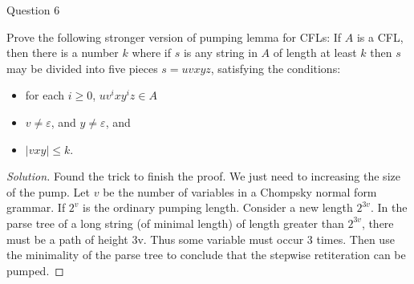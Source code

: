\begin{solution}{Question 6}\label{ques:6}
    \begin{question}
    Prove the following stronger version of pumping lemma for CFLs: 
If $A$ is a CFL, then there is a number $k$ where if $s$ is any string in $A$ of length at least $k$ then $s$ may be divided into five pieces $s = uvxyz$, satisfying the conditions:
\begin{itemize}
    \item for each $i\geq 0$, $uv^ixy^iz \in A$
    \item $v \neq \varepsilon$, and $y \neq \varepsilon$, and
    \item $|vxy| \leq k$.
\end{itemize}
    \end{question}
    \tcblower{}
    \begin{proof}[Solution]
    Found the trick to finish the proof. We just need to increasing the size of the pump. Let $v$ be the number of variables in a Chompsky normal form grammar. If $2^v$ is the ordinary pumping length. Consider a new length $2^{3v}$. In the parse tree of a long string (of minimal length) of length greater than $2^{3v}$, there must be a path of height 3v. Thus some variable must occur 3 times. Then use the minimality of the parse tree to conclude that the stepwise retiteration can be pumped.
    \end{proof}
\end{solution}
